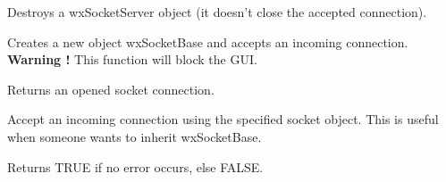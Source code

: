 


%
%


Destroys a wxSocketServer object (it doesn't close the accepted connection).

%
%


Creates a new object wxSocketBase and accepts an incoming connection. {\bf Warning !} This function will block the GUI.


Returns an opened socket connection.



%
%
\label{wxsocketserveracceptwith}


Accept an incoming connection using the specified socket object.
This is useful when someone wants to inherit wxSocketBase.




Returns TRUE if no error occurs, else FALSE.

